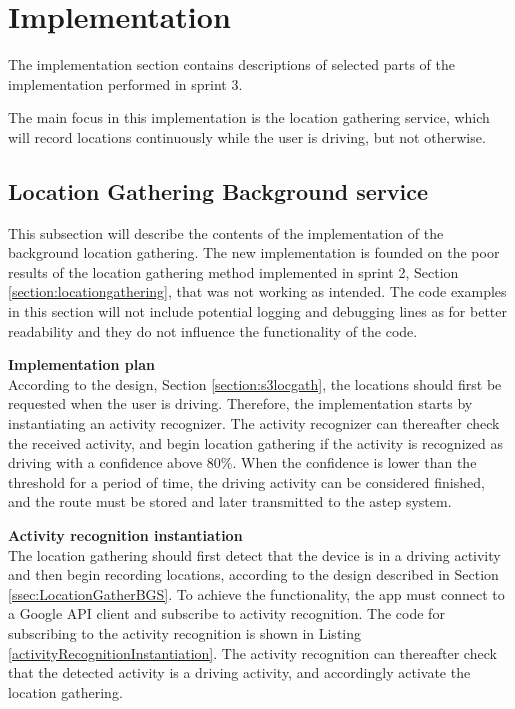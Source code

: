 \section{Implementation}
The implementation section contains descriptions of selected parts of the implementation performed in sprint 3.

The main focus in this implementation is the location gathering service, which will record locations continuously while the user is driving, but not otherwise. 

\subsection{Location Gathering Background service}
This subsection will describe the contents of the implementation of the background location gathering.
The new implementation is founded on the poor results of the location gathering method implemented in sprint 2, Section \ref{section:locationgathering}, that was not working as intended.
The code examples in this section will not include potential logging and debugging lines as for better readability and they do not influence the functionality of the code.

\textbf{Implementation plan}\\
According to the design, Section \ref{section:s3locgath}, the locations should first be requested when the user is driving.
Therefore, the implementation starts by instantiating an activity recognizer.
The activity recognizer can thereafter check the received activity, and begin location gathering if the activity is recognized as driving with a confidence above 80\%.
When the confidence is lower than the threshold for a period of time, the driving activity can be considered finished, and the route must be stored and later transmitted to the \gls{astep} system.


\textbf{Activity recognition instantiation}\\
The location gathering should first detect that the device is in a driving activity and then begin recording locations, according to the design described in Section \ref{ssec:LocationGatherBGS}.
To achieve the functionality, the app must connect to a Google API client and subscribe to activity recognition.
The code for subscribing to the activity recognition is shown in Listing \ref{activityRecognitionInstantiation}.
The activity recognition can thereafter check that the detected activity is a driving activity, and accordingly activate the location gathering.

